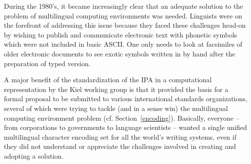 During the 1980's, it became increasingly clear that an adequate solution 
to the problem of multilingual computing environments was needed. Linguists 
were on the forefront of addressing this issue because they faced these 
challenges head-on by wishing to publish and communicate electronic text 
with phonetic symbols which were not included in basic ASCII. One 
only needs to look at facsimiles of older electronic documents to see exotic 
symbols written in by hand after the preparation of typed version.




A major benefit of the standardization of the IPA in a computational
representation by the Kiel working group is that it provided the basis for a
formal proposal to be submitted to various international standards
organizations, several of which were trying to tackle (and in a sense win) the
multilingual computing environment problem (cf. Section~\ref{encoding}).
Basically, everyone -- from corporations to governments to language scientists
-- wanted a single unified multilingual character encoding set for all the
world's writing systems, even if they did not understand or appreciate the
challenges involved in creating and adopting a solution.


